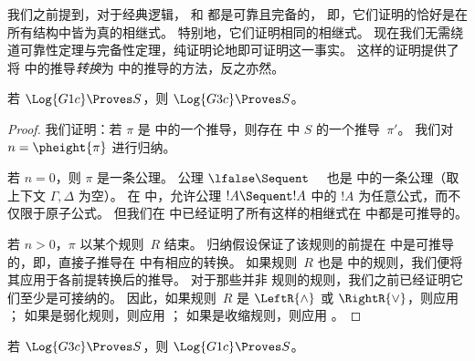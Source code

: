 \documentclass[../../../include/open-logic-section]{subfiles}
\begin{document}


我们之前提到，对于经典逻辑， 和  都是可靠且完备的，
即，它们证明的恰好是在所有结构中皆为真的相继式。
特别地，它们证明相同的相继式。
现在我们无需绕道可靠性定理与完备性定理，纯证明论地即可证明这一事实。
这样的证明提供了将  中的推导\emph{转换}为  中的推导的方法，反之亦然。

\begin{prop}
若 $\Log{G1c} \Proves S$，则 $\Log{G3c} \Proves S$。
\end{prop}

\begin{proof}
  我们证明：若 $\pi$ 是  中的一个推导，则存在  中 $S$ 的一个推导~$\pi'$。
  我们对 $n = \pheight{\pi}$ 进行归纳。

  若 $n = 0$，则 $\pi$ 是一条公理。
  公理 $\lfalse \Sequent \quad$ 也是  中的一条公理（取上下文 $\Gamma, \Delta$ 为空）。
  在  中，允许公理 $!A \Sequent !A$ 中的 $!A$ 为任意公式，而不仅限于原子公式。
  但我们在  中已经证明了所有这样的相继式在  中都是可推导的。

  若 $n > 0$，$\pi$ 以某个规则~$R$ 结束。
  归纳假设保证了该规则的前提在  中是可推导的，即，直接子推导在  中有相应的转换。
  如果规则~$R$ 也是  中的规则，我们便将其应用于各前提转换后的推导。
  对于那些并非  规则的规则，我们之前已经证明它们至少是可接纳的。
  因此，如果规则~$R$ 是 $\LeftR{\land}$ 或 $\RightR{\lor}$，则应用 ；
  如果是弱化规则，则应用 ；
  如果是收缩规则，则应用 。
\end{proof}

\begin{prop}
若 $\Log{G3c} \Proves S$，则 $\Log{G1c} \Proves S$。
\end{prop}
\end{document}
